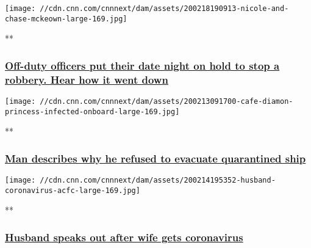 \href{/videos/world/2020/02/19/off-duty-police-officers-stop-robbery-on-date-night-full-episode-acfc-vpx.cnn/video/playlists/acfc-full-episodes/}{}

\texttt{[image: //cdn.cnn.com/cnnnext/dam/assets/200218190913-nicole-and-chase-mckeown-large-169.jpg]}

**

\hypertarget{off-duty-officers-put-their-date-night-on-hold-to-stop-a-robbery-hear-how-it-went-down}{%
\subsubsection{\texorpdfstring{\href{/videos/world/2020/02/19/off-duty-police-officers-stop-robbery-on-date-night-full-episode-acfc-vpx.cnn/video/playlists/acfc-full-episodes/}{Off-duty
officers put their date night on hold to stop a robbery. Hear how it
went
down}}{Off-duty officers put their date night on hold to stop a robbery. Hear how it went down}}\label{off-duty-officers-put-their-date-night-on-hold-to-stop-a-robbery-hear-how-it-went-down}}

\href{/videos/world/2020/02/17/man-quarantined-ship-coronavirus-full-episode-acfc-vpx.cnn/video/playlists/acfc-full-episodes/}{}

\texttt{[image: //cdn.cnn.com/cnnnext/dam/assets/200213091700-cafe-diamon-princess-infected-onboard-large-169.jpg]}

**

\hypertarget{man-describes-why-he-refused-to-evacuate-quarantined-ship}{%
\subsubsection{\texorpdfstring{\href{/videos/world/2020/02/17/man-quarantined-ship-coronavirus-full-episode-acfc-vpx.cnn/video/playlists/acfc-full-episodes/}{Man
describes why he refused to evacuate quarantined
ship}}{Man describes why he refused to evacuate quarantined ship}}\label{man-describes-why-he-refused-to-evacuate-quarantined-ship}}

\href{/videos/world/2020/02/14/passenger-japan-ship-quarantined-coronavirus-acfc-full-episode-vpx.cnn/video/playlists/acfc-full-episodes/}{}

\texttt{[image: //cdn.cnn.com/cnnnext/dam/assets/200214195352-husband-coronavirus-acfc-large-169.jpg]}

**

\hypertarget{husband-speaks-out-after-wife-gets-coronavirus}{%
\subsubsection{\texorpdfstring{\href{/videos/world/2020/02/14/passenger-japan-ship-quarantined-coronavirus-acfc-full-episode-vpx.cnn/video/playlists/acfc-full-episodes/}{Husband
speaks out after wife gets
coronavirus}}{Husband speaks out after wife gets coronavirus}}\label{husband-speaks-out-after-wife-gets-coronavirus}}

